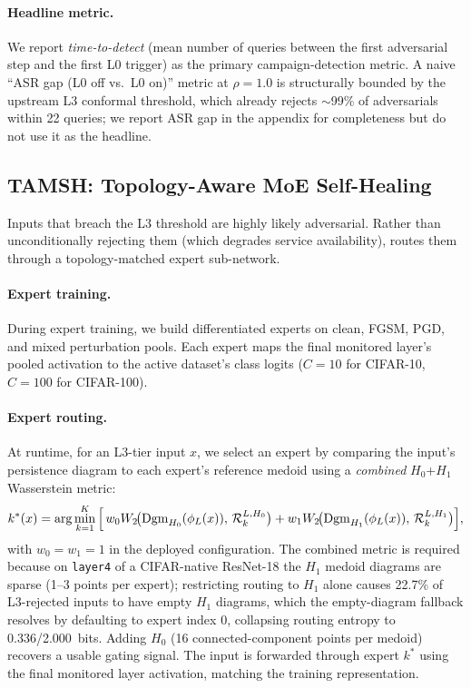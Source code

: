 \paragraph{Headline metric.}
We report \emph{time-to-detect} (mean number of queries between the first
adversarial step and the first L0 trigger) as the primary campaign-detection
metric. A naive ``ASR gap (L0 off vs.\ L0 on)'' metric at $\rho{=}1.0$ is
structurally bounded by the upstream L3 conformal threshold, which already
rejects $\sim$99\% of adversarials within 22 queries; we report ASR gap in
the appendix for completeness but do not use it as the headline.

\subsection{TAMSH: Topology-Aware MoE Self-Healing}
\label{sec:tamsh}

Inputs that breach the L3 threshold are highly likely adversarial.
Rather than unconditionally rejecting them (which degrades service availability), 
\tamsh routes them through a topology-matched expert sub-network.

\paragraph{Expert training.}
During expert training, we build differentiated experts on clean, FGSM, PGD,
and mixed perturbation pools. Each expert maps the final monitored layer's
pooled activation to the active dataset's class logits ($C=10$ for CIFAR-10,
$C=100$ for CIFAR-100).

\paragraph{Expert routing.}
At runtime, for an L3-tier input $x$, we select an expert by comparing the
input's persistence diagram to each expert's reference medoid using a
\emph{combined} $H_0$+$H_1$ Wasserstein metric:
\begin{equation}
  k^*(x) = \arg\min_{k=1}^{K}\, \Bigl[\,
    w_0 W_2\!\bigl(\mathrm{Dgm}_{H_0}(\phi_L(x)),\, \mathcal{R}_k^{L,H_0}\bigr)
  + w_1 W_2\!\bigl(\mathrm{Dgm}_{H_1}(\phi_L(x)),\, \mathcal{R}_k^{L,H_1}\bigr) \Bigr],
  \label{eq:routing}
\end{equation}
with $w_0 = w_1 = 1$ in the deployed configuration.
The combined metric is required because on \texttt{layer4} of a CIFAR-native
ResNet-18 the $H_1$ medoid diagrams are sparse (1--3 points per expert);
restricting routing to $H_1$ alone causes 22.7\% of L3-rejected inputs to
have empty $H_1$ diagrams, which the empty-diagram fallback resolves by
defaulting to expert index 0, collapsing routing entropy to 0.336/2.000~bits.
Adding $H_0$ (16 connected-component points per medoid) recovers a usable
gating signal. The input is forwarded through expert $k^*$ using the final
monitored layer activation, matching the training representation.

